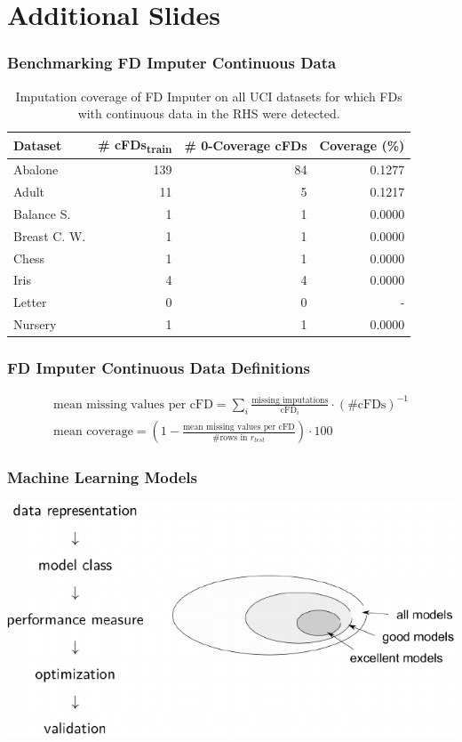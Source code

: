 \documentclass{beamer}
\begin{document}
\section*{Additional Slides}
\begin{frame}
    \frametitle{Benchmarking FD Imputer Continuous Data}
    \begin{table}[ht]
        \centering
        \begin{tabular}{lrrr}
            \toprule
            \toprule
            Dataset & \# cFDs\textsubscript{train} & \# 0-Coverage cFDs  & Coverage (\%) \\
            \midrule
            Abalone & 139 & 84 & 0.1277 \\
            Adult & 11 & 5 & 0.1217 \\
            Balance S. & 1 & 1 & 0.0000 \\
            Breast C. W. & 1 & 1 & 0.0000 \\
            Chess & 1 & 1 & 0.0000 \\
            Iris & 4 & 4 & 0.0000 \\
            Letter & 0 & 0 & - \\
            Nursery & 1 & 1 & 0.0000 \\
            \bottomrule
            \bottomrule
        \end{tabular}
        \caption{Imputation coverage of FD Imputer on all UCI datasets for which FDs with continuous data in the RHS were detected.}\label{tab:fd-imputer-mse}
    \end{table}
\end{frame}

\begin{frame}
    \frametitle{FD Imputer Continuous Data Definitions}
    \begin{align*}
        \text{mean missing values per cFD} = \sum_{i} \frac{\text{missing imputations}}{\text{cFD}_i} \cdot \left(\text{\# cFDs}\right)^{-1} \\
        \text{mean coverage} = \left( 1 - \frac{\text{mean missing values per cFD}}{\text{\# rows in }r_{test}} \right) \cdot 100
    \end{align*}

\end{frame}

\begin{frame}
    \frametitle{Machine Learning Models}
    \includegraphics[width=.95\textwidth]{mi-models.pdf}
\end{frame}
\end{document}
